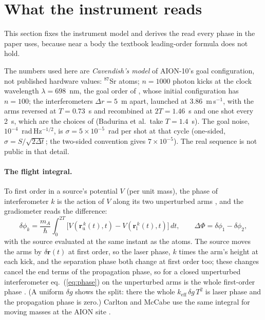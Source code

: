 \documentclass[10pt,a4paper]{article}
\newcommand{\vr}{\mathbf{r}}
\begin{document}
\section{What the instrument reads}\label{sec:read}

This section fixes the instrument model and derives the read every phase in the paper uses, because
near a body the textbook leading-order formula does not hold.

The numbers used here are \emph{Cavendish's model} of AION-10's goal configuration, not published hardware values: $^{87}$Sr atoms; $n=1000$ photon kicks at
the clock wavelength $\lambda = 698$~nm, the goal order of \citet[Table~1]{badurina2020}, whose initial
configuration has $n=100$; the interferometers $\Delta r = 5$~m apart, launched at 3.86~m\,s$^{-1}$,
with the arms reversed at $T=0.73$~s and recombined at $2T = 1.46$~s and one shot every 2~s, which are
the choices of \citet{carlton2023} (Badurina et al.\ take $T=1.4$~s). The goal noise,
$10^{-4}$~rad\,Hz$^{-1/2}$, is $\sigma = 5\times10^{-5}$~rad per shot at that cycle (one-sided,
$\sigma = S/\sqrt{2\Delta t}$; the two-sided convention gives $7\times10^{-5}$). The real sequence is not public in that detail.

\paragraph{The flight integral.} To first order in a source's potential $V$ (per unit mass), the
phase of interferometer $k$ is the action of $V$ along its two unperturbed arms
\citep[\S5.2.1]{hogan2008}, and the gradiometer reads the difference:
\begin{equation}
\delta\phi_k = \frac{m_A}{\hbar}\int_0^{2T}\bigl[V(\vr^{\,k}_\mathrm{u}(t),t) - V(\vr^{\,k}_\mathrm{l}(t),t)\bigr]\,dt,
\qquad \Delta\Phi = \delta\phi_1-\delta\phi_2,
\label{eq:phase}
\end{equation}
with the source evaluated at the same instant as the atoms. The source moves the arms by $\delta\vr(t)$
at first order, so the laser phase, $k$ times the arm's height at each kick, and the separation phase
both change at first order too; these changes cancel the end terms of the propagation phase, so for a
closed unperturbed interferometer eq.~(\ref{eq:phase}) on the unperturbed arms is the whole
first-order phase \citep[\S5.2.1]{hogan2008}. (A uniform $\delta g$ shows the split: there the whole
$k_\mathrm{eff}\,\delta g\,T^2$ is laser phase and the propagation phase is zero.) Carlton and McCabe use
the same integral for moving masses at the AION site \citep[eq.~11 of the arXiv version]{carlton2023}.
\end{document}

